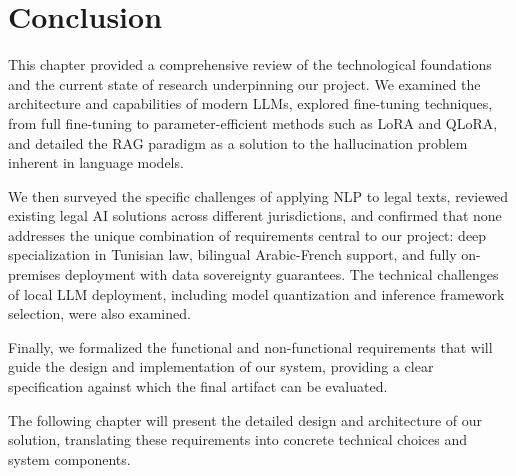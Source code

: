 \section{Conclusion}

This chapter provided a comprehensive review of the technological foundations
and the current state of research underpinning our project. We examined the
architecture and capabilities of modern \ac{LLM}s, explored fine-tuning
techniques, from full fine-tuning to parameter-efficient methods such as
\ac{LoRA} and \ac{QLoRA}, and detailed the \ac{RAG} paradigm as a solution
to the hallucination problem inherent in language models.

\vspace{1em}

We then surveyed the specific challenges of applying \ac{NLP} to legal texts,
reviewed existing legal \ac{AI} solutions across different jurisdictions, and
confirmed that none addresses the unique combination of requirements central
to our project: deep specialization in Tunisian law, bilingual Arabic-French
support, and fully on-premises deployment with data sovereignty guarantees.
The technical challenges of local \ac{LLM} deployment, including model
quantization and inference framework selection, were also examined.

\vspace{1em}

Finally, we formalized the functional and non-functional requirements that
will guide the design and implementation of our system, providing a clear
specification against which the final artifact can be evaluated.

\vspace{1em}

The following chapter will present the detailed design and architecture of
our solution, translating these requirements into concrete technical choices
and system components.
